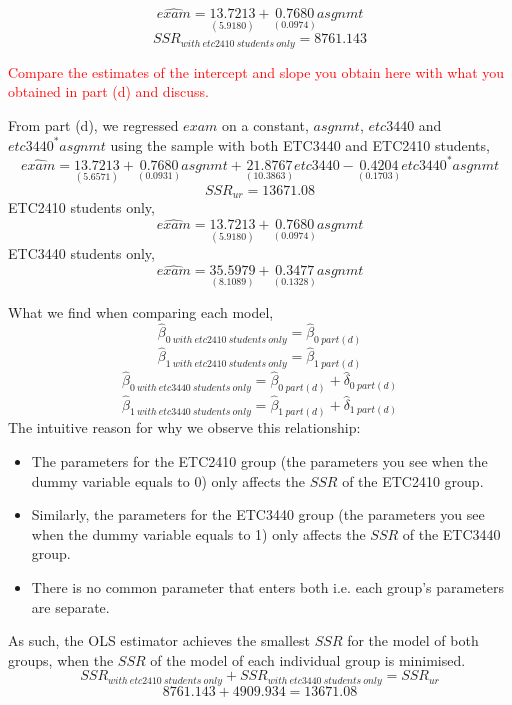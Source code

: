 \documentclass[12pt]{report}
\begin{document}
\vspace{-\baselineskip}
$$\widehat{exam} = \underset{(5.9180)}{13.7213} + \underset{(0.0974)}{0.7680}asgnmt$$
$$SSR_{with\ etc2410\ students\ only} = 8761.143$$

\noindent \textcolor{red}
{
	Compare the estimates of the intercept and slope you obtain here with what you obtained in part (d) and discuss.
}

\noindent From part (d), we regressed $exam$ on a constant, $asgnmt$, $etc3440$ and $etc3440^*asgnmt$ using the sample with both ETC3440 and ETC2410 students,
$$\widehat{exam} = \underset{(5.6571)}{13.7213} + \underset{(0.0931)}{0.7680}asgnmt + \underset{(10.3863)}{21.8767}etc3440 - \underset{(0.1703)}{0.4204}etc3440^*asgnmt$$
$$SSR_{ur} = 13671.08$$
\noindent ETC2410 students only,
$$\widehat{exam} = \underset{(5.9180)}{13.7213} + \underset{(0.0974)}{0.7680}asgnmt$$
\noindent ETC3440 students only,
$$\widehat{exam} = \underset{(8.1089)}{35.5979} + \underset{(0.1328)}{0.3477}asgnmt$$

\noindent What we find when comparing each model,
$$\hat{\beta}_{0\ with\ etc2410\ students\ only} = \hat{\beta}_{0\ part(d)}$$
$$\hat{\beta}_{1\ with\ etc2410\ students\ only} = \hat{\beta}_{1\ part(d)}$$
$$\hat{\beta}_{0\ with\ etc3440\ students\ only} = \hat{\beta}_{0\ part(d)} + \hat{\delta}_{0\ part(d)}$$
$$\hat{\beta}_{1\ with\ etc3440\ students\ only} = \hat{\beta}_{1\ part(d)} + \hat{\delta}_{1\ part(d)}$$
\noindent The intuitive reason for why we observe this relationship: 
\begin{itemize}
	\item The parameters for the ETC2410 group (the parameters you see when the dummy variable equals to 0) only affects the $SSR$ of the ETC2410 group.
	\item Similarly, the parameters for the ETC3440 group (the parameters you see when the dummy variable equals to 1) only affects the $SSR$ of the ETC3440 group.
	\item There is no common parameter that enters both i.e. each group's parameters are separate.
\end{itemize}
\noindent As such, the OLS estimator achieves the smallest $SSR$ for the model of both groups, when the $SSR$ of the model of each individual group is minimised.
$$SSR_{with\ etc2410\ students\ only} + SSR_{with\ etc3440\ students\ only} = SSR_{ur}$$
$$8761.143 + 4909.934 = 13671.08$$
\end{document}
